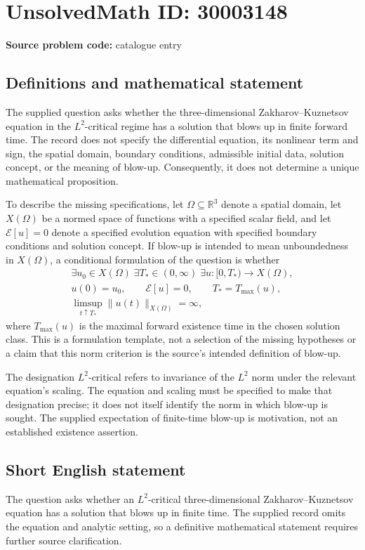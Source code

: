 \documentclass[11pt]{article}
\newcommand{\R}{\mathbb{R}}
\begin{document}
\section*{UnsolvedMath ID: 30003148}
\textbf{Source problem code:} catalogue entry
\subsection{Definitions and mathematical statement}
The supplied question asks whether the three-dimensional Zakharov--Kuznetsov equation in the \(L^2\)-critical regime has a solution that blows up in finite forward time. The record does not specify the differential equation, its nonlinear term and sign, the spatial domain, boundary conditions, admissible initial data, solution concept, or the meaning of blow-up. Consequently, it does not determine a unique mathematical proposition.

To describe the missing specifications, let \(\Omega\subseteq\R^3\) denote a spatial domain, let \(X(\Omega)\) be a normed space of functions with a specified scalar field, and let \(\mathcal E[u]=0\) denote a specified evolution equation with specified boundary conditions and solution concept. If blow-up is intended to mean unboundedness in \(X(\Omega)\), a conditional formulation of the question is whether
\[
\begin{gathered}
\exists u_0\in X(\Omega)\;\exists T_*\in(0,\infty)\;\exists u:[0,T_*)\longrightarrow X(\Omega),\\
u(0)=u_0,\qquad \mathcal E[u]=0,\qquad T_*=T_{\max}(u),\\
\limsup_{t\uparrow T_*}\|u(t)\|_{X(\Omega)}=\infty,
\end{gathered}
\]
where \(T_{\max}(u)\) is the maximal forward existence time in the chosen solution class. This is a formulation template, not a selection of the missing hypotheses or a claim that this norm criterion is the source's intended definition of blow-up.

The designation \(L^2\)-critical refers to invariance of the \(L^2\) norm under the relevant equation's scaling. The equation and scaling must be specified to make that designation precise; it does not itself identify the norm in which blow-up is sought. The supplied expectation of finite-time blow-up is motivation, not an established existence assertion.
\subsection{Short English statement}
The question asks whether an \(L^2\)-critical three-dimensional Zakharov--Kuznetsov equation has a solution that blows up in finite time. The supplied record omits the equation and analytic setting, so a definitive mathematical statement requires further source clarification.
\end{document}
